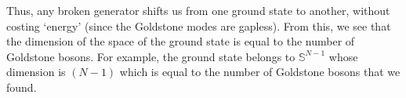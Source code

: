 Thus, any broken generator shifts us from one ground state to another, without costing `energy' (since the Goldstone modes are gapless). From this, we see that the dimension of the space of the ground state is equal to the number of Goldstone bosons. For example, the ground state belongs to $\mathbb{S}^{N-1}$ whose dimension is $(N-1)$ which is equal to the number of Goldstone bosons that we found.